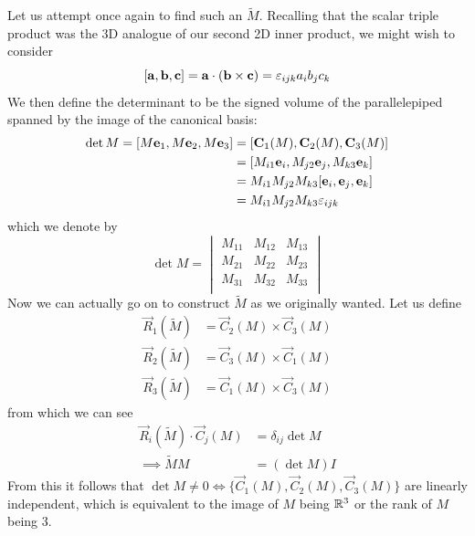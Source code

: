 \documentclass{../template/note}
\begin{document}
    Let us attempt once again to find such an \(\tilde M\). Recalling that the scalar triple product was the 3D analogue of our second 2D inner product, we might wish to consider
    \[
        [\vec a, \vec b, \vec c] = \vec a \cdot (\vec b \times \vec c) = \lv{ijk}a_ib_jc_k
    \]
    We then define the determinant to be the signed volume of the parallelepiped spanned by the image of the canonical basis:
    \begin{align*}
        \det M = [M\vec e_1, M\vec e_2, M \vec e_3] &= [\vec C_1(M), \vec C_2(M), \vec C_3(M)] \\
        &= [M_{i1}\vec e_i, M_{j2}\vec e_j, M_{k3}\vec e_k] \\
        &= M_{i1}M_{j2}M_{k3} [\vec e_i, \vec e_j, \vec e_k] \\
        &= M_{i1}M_{j2}M_{k3} \lv{ijk}
    \end{align*}
    which we denote by
    \[
        \det M = \begin{vmatrix}
         M_{11} & M_{12} & M_{13} \\
         M_{21} & M_{22} & M_{23} \\
         M_{31} & M_{32} & M_{33} \\
        \end{vmatrix}
    \]
    Now we can actually go on to construct \(\tilde M\) as we originally wanted. Let us define
    \begin{align*}
        \vec R_1(\tilde M) &= \vec C_2 (M) \times \vec C_3 (M) \\
        \vec R_2(\tilde M) &= \vec C_3 (M) \times \vec C_1 (M) \\
        \vec R_3(\tilde M) &= \vec C_1 (M) \times \vec C_3 (M)
    \end{align*}
    from which we can see
    \begin{align*}
        \vec R_i(\tilde M) \cdot \vec C_j(M) &= \delta_{ij} \det M \\
        \implies \tilde MM &= (\det M) I
    \end{align*}
    From this it follows that \(\det M \neq 0 \iff \{\vec C_1(M), \vec C_2(M), \vec C_3(M)\}\) are linearly independent, which is equivalent to the image of \(M\) being \(\mathbb R^3\) or the rank of \(M\) being 3.
    
\end{document}
